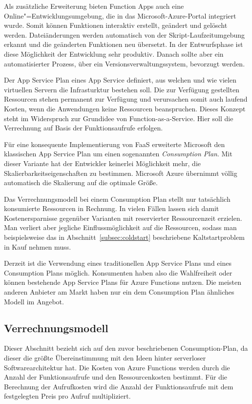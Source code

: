Als zusätzliche Erweiterung bieten Function Apps auch eine Online"=Entwicklungsumgebung, die in das Microsoft-Azure-Portal integriert wurde. Somit können Funktionen interaktiv erstellt, geändert und gelöscht werden. Dateiänderungen werden automatisch von der Skript-Laufzeitumgebung erkannt und die geänderten Funktionen neu übersetzt. In der Entwurfsphase ist diese Möglichkeit der Entwicklung sehr produktiv. Danach sollte aber ein automatisierter Prozess, \zB über ein Versionsverwaltungssystem, bevorzugt werden.

Der App Service Plan eines App Service definiert, aus welchen und wie vielen virtuellen Servern die Infrasturktur bestehen soll. Die zur Verfügung gestellten Ressourcen stehen permanent zur Verfügung und verursachen somit auch laufend Kosten, wenn die Anwendungen keine Ressourcen beanspruchen. Dieses Konzept steht im Widerspruch zur Grundidee von Function-as-a-Service. Hier soll die Verrechnung auf Basis der Funktionsaufrufe erfolgen. 

Für eine konsequente Implementierung von FaaS erweiterte Microsoft den klassischen App Service Plan um einen sogenannten \textit{Consumption Plan}. Mit dieser Variante hat der Entwickler keinerlei Möglichkeit mehr, die Skalierbarkeitseigenschaften zu bestimmen. Microsoft Azure übernimmt völlig automatisch die Skalierung auf die optimale Größe.

Das Verrechnungsmodell bei einem Consumption Plan stellt nur tatsächlich konsumierte Ressourcen in Rechnung. In vielen Fällen lassen sich damit Kostenersparnisse gegenüber Varianten mit reservierter Ressourcenzeit erzielen. Man verliert aber jegliche Einflussmöglichkeit auf die Ressourcen, sodass man beispielsweise das in Abschnitt~\ref{subsec:coldstart} beschriebene Kaltstartproblem in Kauf nehmen muss.

Derzeit ist die Verwendung eines traditionellen App Service Plans und eines Consumption Plans möglich. Konsumenten haben also die Wahlfreiheit oder können bestehende App Service Plans für Azure Functions nutzen. Die meisten anderen Anbieter am Markt haben nur ein dem Consumption Plan ähnliches Modell im Angebot.

\subsection{Verrechnungsmodell}

Dieser Abschnitt bezieht sich auf den zuvor beschriebenen Consumption-Plan, da dieser die größte Übereinstimmung mit den Ideen hinter serverloser Softwarearchitektur hat. Die Kosten von Azure Functions werden durch die Anzahl der Funktionsaufrufe und den Ressourcenkosten bestimmt. Für die Berechnung der Aufrufkosten wird die Anzahl der Funktionsaufrufe mit dem festgelegten Preis pro Aufruf multipliziert.

